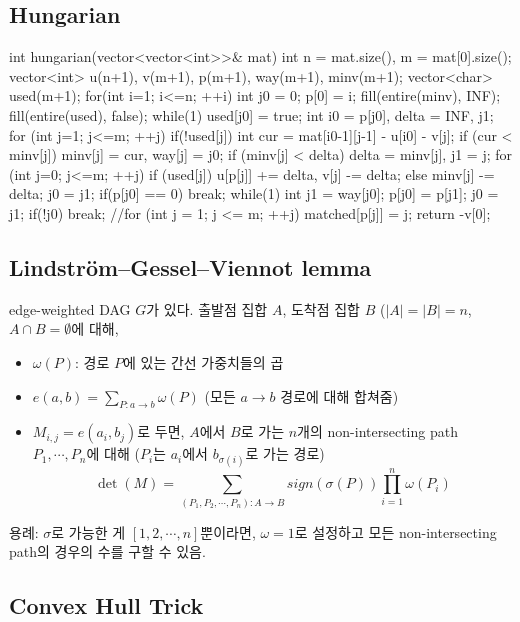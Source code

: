 \subsection{Hungarian}
\begin{cpp}
int hungarian(vector<vector<int>>& mat){
  int n = mat.size(), m = mat[0].size();
  vector<int> u(n+1), v(m+1), p(m+1), way(m+1), minv(m+1);
  vector<char> used(m+1);
  for(int i=1; i<=n; ++i) {
    int j0 = 0; p[0] = i;
    fill(entire(minv), INF);
    fill(entire(used), false);
    while(1){
      used[j0] = true;
      int i0 = p[j0], delta = INF, j1;
      for (int j=1; j<=m; ++j) if(!used[j]) {
        int cur = mat[i0-1][j-1] - u[i0] - v[j];
        if (cur < minv[j]) minv[j] = cur, way[j] = j0;
        if (minv[j] < delta) delta = minv[j], j1 = j;
      }
      for (int j=0; j<=m; ++j) {
        if (used[j]) u[p[j]] += delta, v[j] -= delta;
        else minv[j] -= delta;
      }
      j0 = j1;
      if(p[j0] == 0) break;
    }
    while(1){
      int j1 = way[j0];
      p[j0] = p[j1]; j0 = j1;
      if(!j0) break;
    }
  }
  //for (int j = 1; j <= m; ++j) matched[p[j]] = j;
  return -v[0];
}
\end{cpp}

\subsection{Lindström–Gessel–Viennot lemma}

edge-weighted DAG $G$가 있다. 출발점 집합 $A$, 도착점 집합 $B$ ($|A| = |B| = n$, $A \cap B = \emptyset$에 대해, 

\begin{itemize}
    \item $\omega(P)$: 경로 $P$에 있는 간선 가중치들의 곱
    \item $e(a, b) = \sum_{P:a \rightarrow b} \omega(P)$ (모든 $a \rightarrow b$ 경로에 대해 합쳐줌)
    \item $M_{i,j} = e(a_{i}, b_{j})$로 두면, $A$에서 $B$로 가는 $n$개의 non-intersecting path $P_{1}, \cdots, P_{n}$에 대해 ($P_i$는 $a_i$에서 $b_{\sigma(i)}$로 가는 경로)
    $$\det(M) = \sum_{(P_1, P_2, \cdots, P_n) : A \rightarrow B} sign(\sigma(P)) \prod_{i=1}^{n} \omega(P_{i})$$
\end{itemize}

용례: $\sigma$로 가능한 게 $[1, 2, \cdots, n]$뿐이라면, $\omega = 1$로 설정하고 모든 non-intersecting path의 경우의 수를 구할 수 있음.

\subsection{Convex Hull Trick}

